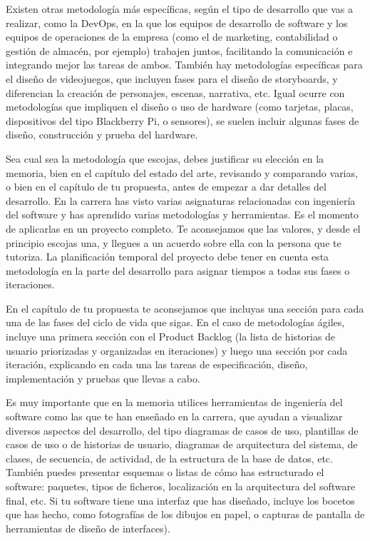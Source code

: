 Existen otras metodología más específicas, según el tipo de desarrollo que vas a realizar, como la DevOps, en la que los  equipos de desarrollo  de software y los equipos de operaciones de la empresa (como el de marketing, contabilidad o gestión de almacén, por ejemplo) trabajen juntos, facilitando la comunicación e integrando mejor las tareas de ambos. También hay metodologías específicas para el diseño de videojuegos, que incluyen fases para el diseño de storyboards, y diferencian la creación de personajes, escenas, narrativa, etc. Igual ocurre con metodologías que impliquen el diseño o uso de hardware (como tarjetas, placas, dispositivos del tipo Blackberry Pi, o sensores), se suelen incluir algunas fases de diseño, construcción y prueba del hardware. 


Sea cual sea la metodología que escojas, debes justificar su elección en la memoria, bien en el capítulo del estado del arte,  revisando y comparando varias, o bien en el capítulo de tu propuesta, antes de empezar a dar detalles del desarrollo. En la carrera has visto varias asignaturas relacionadas con ingeniería del software y has aprendido varias metodologías y herramientas. Es el momento de aplicarlas en un proyecto completo. Te aconsejamos que las valores, y desde el principio escojas una, y llegues a un acuerdo sobre ella con la persona que te tutoriza. La planificación temporal del proyecto debe tener en cuenta esta metodología en la parte del desarrollo para asignar tiempos a todas sus fases o iteraciones. 

En el capítulo de tu propuesta te aconsejamos que incluyas una sección para cada una de las fases del ciclo de vida que sigas. En el caso de metodologías ágiles, incluye una primera sección con el Product Backlog (la lista de historias de usuario priorizadas y organizadas en iteraciones) y luego una sección por cada iteración, explicando en cada una las tareas de especificación, diseño, implementación y pruebas que llevas a cabo.

Es muy importante que en la memoria utilices herramientas de ingeniería del software como las que te han enseñado en la carrera, que ayudan a visualizar diversos aspectos del desarrollo, del tipo diagramas de casos de uso, plantillas de casos de uso o de historias de usuario, diagramas de arquitectura del sistema, de clases, de secuencia, de actividad, de la estructura de la base de datos, etc. También puedes presentar esquemas o listas de cómo has estructurado el software: paquetes, tipos de ficheros, localización en la arquitectura del software final, etc. Si tu software tiene una interfaz que has diseñado, incluye los bocetos que has hecho, como fotografías de los dibujos en papel, o capturas de pantalla de herramientas de diseño de interfaces). 

